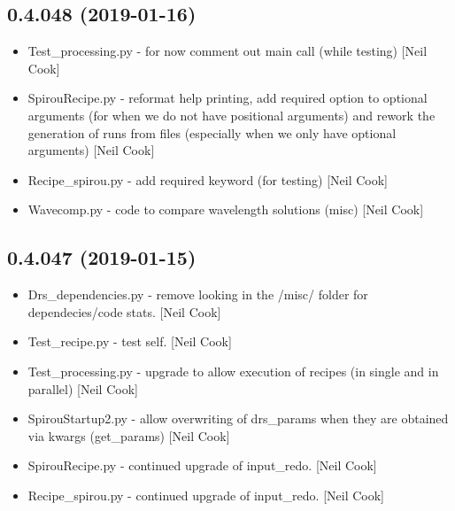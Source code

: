 \documentclass[a4paper,10pt,english]{report}
\begin{document}
\subsection{0.4.048 (2019-01-16)}
\label{\detokenize{misc/changelog:id214}}\begin{itemize}
\item {} 
Test\_processing.py - for now comment out main call (while testing)
{[}Neil Cook{]}

\item {} 
SpirouRecipe.py - reformat help printing, add required option to
optional arguments (for when we do not have positional arguments) and
rework the generation of runs from files (especially when we only have
optional arguments) {[}Neil Cook{]}

\item {} 
Recipe\_spirou.py - add required keyword (for testing) {[}Neil Cook{]}

\item {} 
Wavecomp.py - code to compare wavelength solutions (misc) {[}Neil Cook{]}

\end{itemize}


\subsection{0.4.047 (2019-01-15)}
\label{\detokenize{misc/changelog:id215}}\begin{itemize}
\item {} 
Drs\_dependencies.py - remove looking in the /misc/ folder for
dependecies/code stats. {[}Neil Cook{]}

\item {} 
Test\_recipe.py - test self. {[}Neil Cook{]}

\item {} 
Test\_processing.py - upgrade to allow execution of recipes (in single
and in parallel) {[}Neil Cook{]}

\item {} 
SpirouStartup2.py - allow overwriting of drs\_params when they are
obtained via kwargs (get\_params) {[}Neil Cook{]}

\item {} 
SpirouRecipe.py - continued upgrade of input\_redo. {[}Neil Cook{]}

\item {} 
Recipe\_spirou.py - continued upgrade of input\_redo. {[}Neil Cook{]}

\end{itemize}
\end{document}
